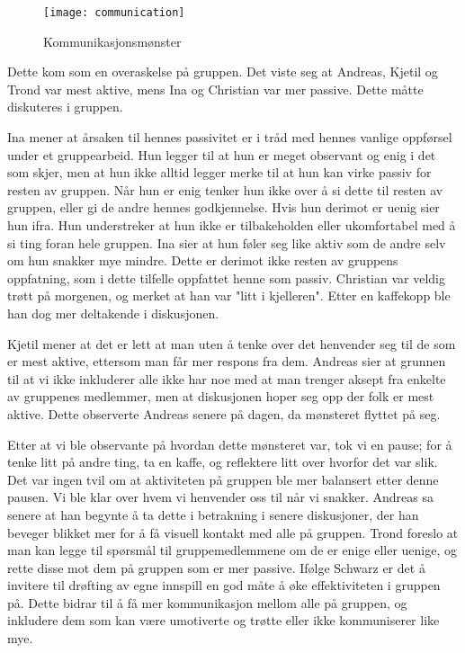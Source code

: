 \begin{figure} [here]
	\begin{center}
			\texttt{[image: communication]}
	\end{center}
	\caption{Kommunikasjonsmønster}
	\label{fig:pattern}
\end{figure}
		

	Dette kom som en overaskelse på gruppen. Det viste seg at Andreas, Kjetil og Trond var mest aktive, mens Ina og Christian var mer passive. Dette måtte diskuteres i gruppen.

	Ina mener at årsaken til hennes passivitet er i tråd med hennes vanlige oppførsel under et gruppearbeid. Hun legger til at hun er meget observant og enig i det som skjer, men at hun ikke alltid legger merke til at hun kan virke passiv for resten av gruppen. Når hun er enig tenker hun ikke over å si dette til resten av gruppen, eller gi de andre hennes godkjennelse. Hvis hun derimot er uenig sier hun ifra. Hun understreker at hun ikke er tilbakeholden eller ukomfortabel med å si ting foran hele gruppen. Ina sier at hun føler seg like aktiv som de andre selv om hun snakker mye mindre. Dette er derimot ikke resten av gruppens oppfatning, som i dette tilfelle oppfattet henne som passiv. Christian var veldig trøtt på morgenen, og merket at han var "litt i kjelleren". Etter en kaffekopp ble han dog mer deltakende i diskusjonen.

	Kjetil mener at det er lett at man uten å tenke over det henvender seg til de som er mest aktive, ettersom man får mer respons fra dem. Andreas sier at grunnen til at vi ikke inkluderer alle ikke har noe med at man trenger aksept fra enkelte av gruppenes medlemmer, men at diskusjonen hoper seg opp der folk er mest aktive. Dette observerte Andreas senere på dagen, da mønsteret flyttet på seg.

	Etter at vi ble observante på hvordan dette mønsteret var, tok vi en pause; for å tenke litt på andre ting, ta en kaffe, og reflektere litt over hvorfor det var slik. Det var ingen tvil om at aktiviteten på gruppen ble mer balansert etter denne pausen. Vi ble klar over hvem vi henvender oss til når vi snakker. Andreas sa senere at han begynte å ta dette i betrakning i senere diskusjoner, der han beveger blikket mer for å få visuell kontakt med alle på gruppen. Trond foreslo at man kan legge til spørsmål til gruppemedlemmene om de er enige eller uenige, og rette disse mot dem på gruppen som er mer passive. Ifølge Schwarz \cite{Schwarz} er det å invitere til drøfting av egne innspill en god måte å øke effektiviteten i gruppen på. Dette bidrar til å få mer kommunikasjon mellom alle på gruppen, og inkludere dem som kan være umotiverte og trøtte eller ikke kommuniserer like mye. 

